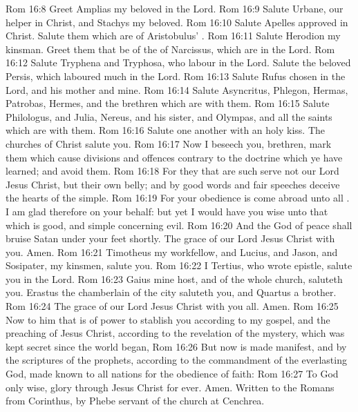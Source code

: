 \vs Rom 16:8 Greet Amplias my beloved in the Lord.
\vs Rom 16:9 Salute Urbane, our helper in Christ, and Stachys my beloved.
\vs Rom 16:10 Salute Apelles approved in Christ. Salute them which are of Aristobulus' .
\vs Rom 16:11 Salute Herodion my kinsman. Greet them that be of the  of Narcissus, which are in the Lord.
\vs Rom 16:12 Salute Tryphena and Tryphosa, who labour in the Lord. Salute the beloved Persis, which laboured much in the Lord.
\vs Rom 16:13 Salute Rufus chosen in the Lord, and his mother and mine.
\vs Rom 16:14 Salute Asyncritus, Phlegon, Hermas, Patrobas, Hermes, and the brethren which are with them.
\vs Rom 16:15 Salute Philologus, and Julia, Nereus, and his sister, and Olympas, and all the saints which are with them.
\vs Rom 16:16 Salute one another with an holy kiss. The churches of Christ salute you.
\vs Rom 16:17 Now I beseech you, brethren, mark them which cause divisions and offences contrary to the doctrine which ye have learned; and avoid them.
\vs Rom 16:18 For they that are such serve not our Lord Jesus Christ, but their own belly; and by good words and fair speeches deceive the hearts of the simple.
\vs Rom 16:19 For your obedience is come abroad unto all . I am glad therefore on your behalf: but yet I would have you wise unto that which is good, and simple concerning evil.
\vs Rom 16:20 And the God of peace shall bruise Satan under your feet shortly. The grace of our Lord Jesus Christ  with you. Amen.
\vs Rom 16:21 Timotheus my workfellow, and Lucius, and Jason, and Sosipater, my kinsmen, salute you.
\vs Rom 16:22 I Tertius, who wrote  epistle, salute you in the Lord.
\vs Rom 16:23 Gaius mine host, and of the whole church, saluteth you. Erastus the chamberlain of the city saluteth you, and Quartus a brother.
\vs Rom 16:24 The grace of our Lord Jesus Christ  with you all. Amen.
\vs Rom 16:25 Now to him that is of power to stablish you according to my gospel, and the preaching of Jesus Christ, according to the revelation of the mystery, which was kept secret since the world began,
\vs Rom 16:26 But now is made manifest, and by the scriptures of the prophets, according to the commandment of the everlasting God, made known to all nations for the obedience of faith:
\vs Rom 16:27 To God only wise,  glory through Jesus Christ for ever. Amen. Written to the Romans from Corinthus,  by Phebe servant of the church at Cenchrea.
